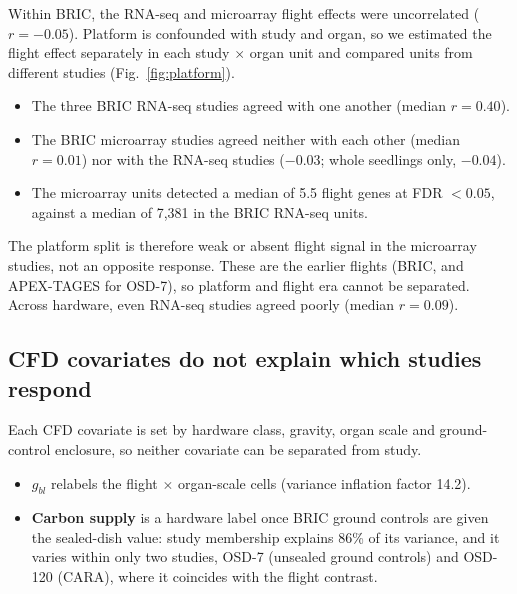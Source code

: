 \documentclass[11pt,a4paper]{article}
\begin{document}
Within BRIC, the RNA-seq and microarray flight effects were uncorrelated ($r = -0.05$). Platform is confounded with study and organ, so we estimated the flight effect separately in each study $\times$ organ unit and compared units from different studies (Fig.~\ref{fig:platform}).
\begin{itemize}
    \item The three BRIC RNA-seq studies agreed with one another (median $r = 0.40$).
    \item The BRIC microarray studies agreed neither with each other (median $r = 0.01$) nor with the RNA-seq studies ($-0.03$; whole seedlings only, $-0.04$).
    \item The microarray units detected a median of 5.5 flight genes at FDR $< 0.05$, against a median of 7,381 in the BRIC RNA-seq units.
\end{itemize}
The platform split is therefore weak or absent flight signal in the microarray studies, not an opposite response. These are the earlier flights (BRIC, and APEX-TAGES for OSD-7), so platform and flight era cannot be separated. Across hardware, even RNA-seq studies agreed poorly (median $r = 0.09$).

\subsection*{CFD covariates do not explain which studies respond}

Each CFD covariate is set by hardware class, gravity, organ scale and ground-control enclosure, so neither covariate can be separated from study.
\begin{itemize}
    \item \textbf{$g_{bl}$} relabels the flight $\times$ organ-scale cells (variance inflation factor 14.2).
    \item \textbf{Carbon supply} is a hardware label once BRIC ground controls are given the sealed-dish value: study membership explains 86\% of its variance, and it varies within only two studies, OSD-7 (unsealed ground controls) and OSD-120 (CARA), where it coincides with the flight contrast.
\end{itemize}
\end{document}
